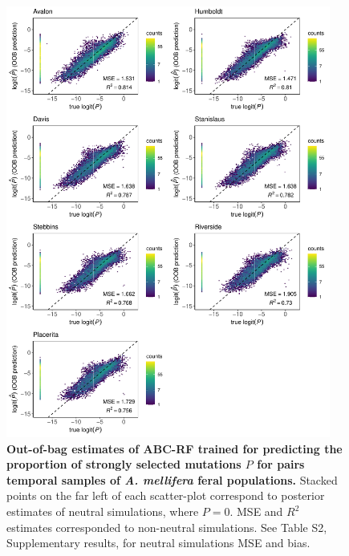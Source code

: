 \documentclass[a4paper, 12pt]{article}
\begin{document}
\begin{figure}[ht]
 \centering
 \includegraphics[width=0.95\textwidth]{Figures/FigureS19_combined_plot_pstrong.pdf}
 \small\caption{\textbf{Out-of-bag estimates of ABC-RF trained for predicting the proportion of strongly selected mutations $P$ for pairs temporal samples of \textit{A. mellifera} feral populations.} Stacked points on the far left of each scatter-plot correspond to posterior estimates of neutral simulations, where $P = 0$. MSE and $R^2$ estimates corresponded to non-neutral simulations. See Table S2, Supplementary results, for neutral simulations MSE and bias.}
 \label{fig:supple_feralbee_pstrong}
\end{figure}
\end{document}
